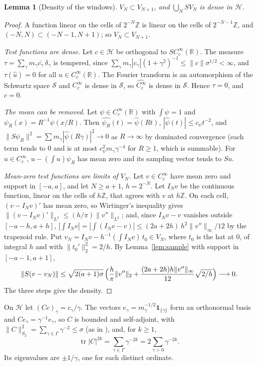\documentclass[11pt,a4paper]{article}
\theoremstyle{plain}
\newtheorem{lemma}[theorem]{Lemma}
\theoremstyle{remark}
\DeclareMathOperator{\tr}{tr}
\newcommand{\R}{\mathbb R}
\newcommand{\Hs}{\mathcal H}
\begin{document}
\begin{lemma}[Density of the windows]\label{lem:dense}
$V_N\subset V_{N+1}$, and $\bigcup_NSV_N$ is dense in $\Hs$.
\end{lemma}
\begin{proof}
A function linear on the cells of $2^{-N}\mathbb Z$ is linear on the cells of $2^{-N-1}\mathbb Z$, and $(-N,N)\subset
(-N-1,N+1)$; so $V_N\subset V_{N+1}$.

\emph{Test functions are dense.} Let $c\in\Hs$ be orthogonal to $SC_c^\infty(\R)$. The measure
$\tau=\sum_\gamma m_\gamma\overline{c_\gamma}\,\delta_\gamma$ is tempered, since $\sum_\gamma
m_\gamma|c_\gamma|(1+\gamma^2)^{-1}\le\|c\|\sigma^{1/2}<\infty$, and $\tau(\widehat u)=0$ for all $u\in
C_c^\infty(\R)$. The Fourier transform is an automorphism of the Schwartz space $\mathcal S$ and $C_c^\infty$ is dense
in $\mathcal S$, so $\widehat{C_c^\infty}$ is dense in $\mathcal S$. Hence $\tau=0$, and $c=0$.

\emph{The mean can be removed.} Let $\psi\in C_c^\infty(\R)$ with $\int\psi=1$ and $\psi_R(x)=R^{-1}\psi(x/R)$.
Then $\widehat{\psi_R}(t)=\widehat\psi(Rt)$, $|\widehat\psi(t)|\le c_\psi t^{-2}$, and
$\|S\psi_R\|^2=\sum m_\gamma|\widehat\psi(R\gamma)|^2\to0$ as $R\to\infty$ by dominated convergence (each term
tends to $0$ and is at most $c_\psi^2m_\gamma\gamma^{-4}$ for $R\ge1$, which is summable). For $u\in C_c^\infty$,
$u-(\int u)\psi_R$ has mean zero and its sampling vector tends to $Su$.

\emph{Mean-zero test functions are limits of $V_N$.} Let $v\in C_c^\infty$ have mean zero and support in $[-a,a]$, and
let $N\ge a+1$, $h=2^{-N}$. Let $I_Nv$ be the continuous function, linear on the cells of $h\mathbb Z$, that agrees
with $v$ at $h\mathbb Z$. On each cell, $(v-I_Nv)'$ has mean zero, so Wirtinger's inequality gives
$\|(v-I_Nv)'\|_{L^2}\le (h/\pi)\|v''\|_{L^2}$; and, since $I_Nv-v$ vanishes outside $[-a-h,a+h]$,
$|\int I_Nv|=|\int(I_Nv-v)|\le (2a+2h)\,h^2\|v''\|_\infty/12$ by the trapezoid rule. Put $v_N=I_Nv-h^{-1}(\int I_Nv)\,t_0\in V_N$, where $t_0$ is the hat at $0$, of integral $h$ and
with $\|t_0'\|_2^2=2/h$. By Lemma~\ref{lem:sample} with support in $[-a-1,a+1]$,
\[
 \|S(v-v_N)\|\le\sqrt{2(a+1)\sigma}\,\Bigl(\frac h\pi\|v''\|_2+\frac{(2a+2h)h\|v''\|_\infty}{12}\sqrt{2/h}\Bigr)
 \longrightarrow0 .
\]
The three steps give the density.
\end{proof}

On $\Hs$ let $(Cc)_\gamma=c_\gamma/\gamma$. The vectors $e_\gamma=m_\gamma^{-1/2}\mathbf 1_{\{\gamma\}}$ form an
orthonormal basis and $Ce_\gamma=\gamma^{-1}e_\gamma$, so $C$ is bounded and self-adjoint, with
$\|C\|_{S_2}^2=\sum_{\gamma\in\Gamma}\gamma^{-2}\le\sigma$ (as in \cite[§2.3]{suzuki}), and, for $k\ge1$,
\[
 \tr|C|^{2k}=\sum_{\gamma\in\Gamma}\gamma^{-2k}=2\sum_{\gamma>0}\gamma^{-2k}.
\]
Its eigenvalues are $\pm1/\gamma$, one for each distinct ordinate.
\end{document}
